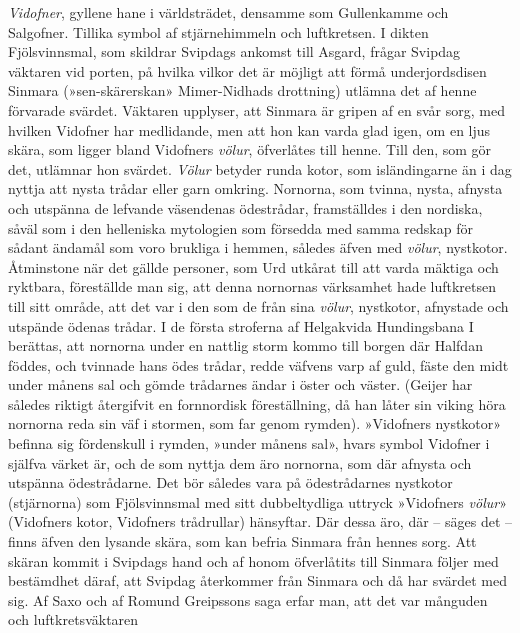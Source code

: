 \emph{Vidofner}, gyllene hane i världsträdet, densamme som Gullenkamme
och Salgofner. Tillika symbol af stjärnehimmeln och luftkretsen. I
dikten Fjölsvinnsmal, som skildrar Svipdags ankomst till Asgard, frågar
Svipdag väktaren vid porten, på hvilka vilkor det är möjligt att förmå
underjordsdisen Sinmara (»sen-skärerskan» Mimer-Nidhads drottning)
utlämna det af henne förvarade svärdet. Väktaren upplyser, att Sinmara
är gripen af en svår sorg, med hvilken Vidofner har medlidande, men att
hon kan varda glad igen, om en ljus skära, som ligger bland Vidofners
\emph{völur}, öfverlåtes till henne. Till den, som gör det, utlämnar hon
svärdet. \emph{Völur} betyder runda kotor, som isländingarne än i dag
nyttja att nysta trådar eller garn omkring. Nornorna, som tvinna, nysta,
afnysta och utspänna de lefvande väsendenas ödestrådar, framställdes i
den nordiska, såväl som i den helleniska mytologien som försedda med
samma redskap för sådant ändamål som voro brukliga i hemmen, således
äfven med \emph{völur}, nystkotor. Åtminstone när det gällde personer,
som Urd utkårat till att varda mäktiga och ryktbara, föreställde man
sig, att denna nornornas värksamhet hade luftkretsen till sitt område,
att det var i den som de från sina \emph{völur}, nystkotor, afnystade
och utspände ödenas trådar. I de första stroferna af Helgakvida
Hundingsbana I berättas, att nornorna under en nattlig storm kommo till
borgen där Halfdan föddes, och tvinnade hans ödes trådar, redde väfvens
varp af guld, fäste den midt under månens sal och gömde trådarnes ändar
i öster och väster. (Geijer har således riktigt återgifvit en
fornnordisk föreställning, då han låter sin viking höra nornorna reda
sin väf i stormen, som far genom rymden). »Vidofners nystkotor» befinna
sig fördenskull i rymden, »under månens sal», hvars symbol Vidofner i
själfva värket är, och de som nyttja dem äro nornorna, som där afnysta
och utspänna ödestrådarne. Det bör således vara på ödestrådarnes
nystkotor (stjärnorna) som Fjölsvinnsmal med sitt dubbeltydliga uttryck
»Vidofners \emph{völur}» (Vidofners kotor, Vidofners trådrullar)
hänsyftar. Där dessa äro, där -- säges det -- finns äfven den lysande
skära, som kan befria Sinmara från hennes sorg. Att skäran kommit i
Svipdags hand och af honom öfverlåtits till Sinmara följer med
bestämdhet däraf, att Svipdag återkommer från Sinmara och då har svärdet
med sig. Af Saxo och af Romund Greipssons saga erfar man, att det var
månguden och
luftkretsväktaren\protect\hypertarget{lb1625905.xhtmlux5cux23start246}{}{}\protect\hypertarget{lb1625905.xhtmlux5cux23start246-a}{}{}\protect\hypertarget{lb1625905.xhtmlux5cux23start246-b}{}{}\protect\hypertarget{lb1625905.xhtmlux5cux23start246-c}{}{}\protect\hypertarget{lb1625905.xhtmlux5cux23start246-d}{}{}
